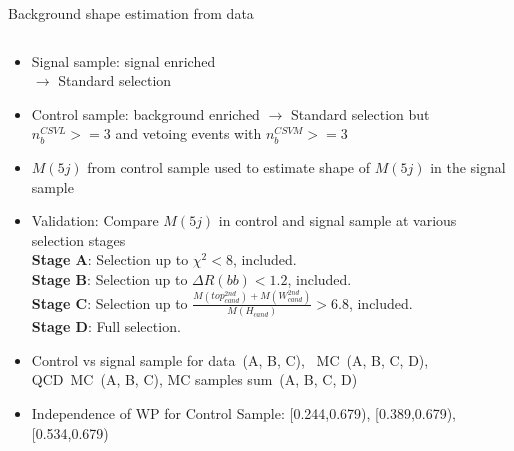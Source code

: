 \begin{frame}{Background shape estimation from data}
\vspace{-.2cm}

\begin{columns}
\begin{column}{.50\textwidth}
   \begin{block}{}\tiny
     \begin{itemize}
     \item Signal sample: signal enriched \\$\to$ Standard selection
     \item Control sample: background enriched $\to$ Standard selection but $n_{b}^{CSVL}>=3$ and vetoing events with $n_{b}^{CSVM}>=3$
     \item $M(5j)$ from control sample used to estimate shape of $M(5j)$ in the signal sample
     \item Validation: Compare $M(5j)$ in control and signal sample at various selection stages\\%
     \textbf{Stage A}: Selection up to $\chi^{2}<8$, included.\\
     \textbf{Stage B}: Selection up to $\Delta R(bb) <1.2$, included.\\
     \textbf{Stage C}: Selection up to $\frac{M(top^{2nd}_{cand})+M(W^{2nd}_{cand})}{M(H_{cand})}>6.8$, included.\\
     \textbf{Stage D}: Full selection.
     \item Control vs signal sample for data~(A, B, C), \ttbar~MC~(A, B, C, D), QCD~MC~(A, B, C), MC samples sum~(A, B, C, D)%
     \item Independence of WP for Control Sample: [0.244,0.679), [0.389,0.679), [0.534,0.679)
     \end{itemize}
    \end{block}

\end{column}


\end{columns}
\end{frame}
